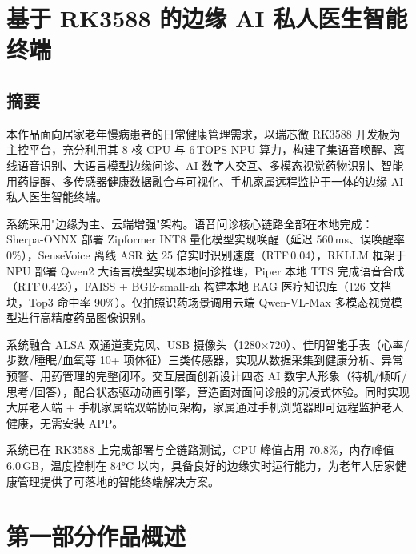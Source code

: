 \documentclass[12pt, a4paper]{ctexart}
\begin{document}
\section*{基于 RK3588 的边缘 AI 私人医生智能终端}

\subsection*{摘要}

本作品面向居家老年慢病患者的日常健康管理需求，以瑞芯微 RK3588 开发板为主控平台，充分利用其 8 核 CPU 与 6\,TOPS NPU 算力，构建了集语音唤醒、离线语音识别、大语言模型边缘问诊、AI 数字人交互、多模态视觉药物识别、智能用药提醒、多传感器健康数据融合与可视化、手机家属远程监护于一体的边缘 AI 私人医生智能终端。

系统采用"边缘为主、云端增强"架构。语音问诊核心链路全部在本地完成：Sherpa-ONNX 部署 Zipformer INT8 量化模型实现唤醒（延迟 560\,ms、误唤醒率 0\%），SenseVoice 离线 ASR 达 25 倍实时识别速度（RTF\,0.04），RKLLM 框架于 NPU 部署 Qwen2 大语言模型实现本地问诊推理，Piper 本地 TTS 完成语音合成（RTF\,0.423），FAISS + BGE-small-zh 构建本地 RAG 医疗知识库（126 文档块，Top3 命中率 90\%）。仅拍照识药场景调用云端 Qwen-VL-Max 多模态视觉模型进行高精度药品图像识别。

系统融合 ALSA 双通道麦克风、USB 摄像头（1280$\times$720）、佳明智能手表（心率/步数/睡眠/血氧等 10+ 项体征）三类传感器，实现从数据采集到健康分析、异常预警、用药管理的完整闭环。交互层面创新设计四态 AI 数字人形象（待机/倾听/思考/回答），配合状态驱动动画引擎，营造面对面问诊般的沉浸式体验。同时实现大屏老人端 + 手机家属端双端协同架构，家属通过手机浏览器即可远程监护老人健康，无需安装 APP。

系统已在 RK3588 上完成部署与全链路测试，CPU 峰值占用 70.8\%，内存峰值 6.0\,GB，温度控制在 84°C 以内，具备良好的边缘实时运行能力，为老年人居家健康管理提供了可落地的智能终端解决方案。

\newpage

\section{第一部分\quad 作品概述}
\end{document}
